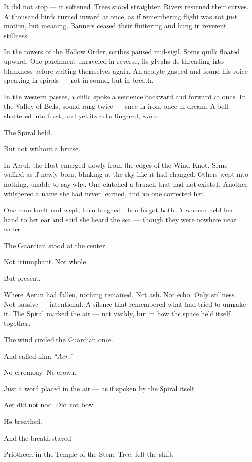 \documentclass[12pt]{article}
\begin{document}
It did not stop — it softened. Trees stood straighter. Rivers resumed their curves. A thousand birds turned inward at once, as if remembering flight was not just motion, but meaning. Banners ceased their fluttering and hung in reverent stillness.

In the towers of the Hollow Order, scribes paused mid-sigil. Some quills floated upward. One parchment unraveled in reverse, its glyphs de-threading into blankness before writing themselves again. An acolyte gasped and found his voice speaking in spirals — not in sound, but in breath.

In the western passes, a child spoke a sentence backward and forward at once. In the Valley of Bells, sound rang twice — once in iron, once in dream. A bell shattered into frost, and yet its echo lingered, warm.

The Spiral held.

But not without a bruise.

In Aerul, the Host emerged slowly from the edges of the Wind-Knot. Some walked as if newly born, blinking at the sky like it had changed. Others wept into nothing, unable to say why. One clutched a branch that had not existed. Another whispered a name she had never learned, and no one corrected her.

One man knelt and wept, then laughed, then forgot both. A woman held her hand to her ear and said she heard the sea — though they were nowhere near water.

The Guardian stood at the center.

Not triumphant. Not whole.

But present.

Where Aerun had fallen, nothing remained. Not ash. Not echo. Only stillness. Not passive — intentional. A silence that remembered what had tried to unmake it. The Spiral marked the air — not visibly, but in how the space held itself together.

The wind circled the Guardian once.

And called him: \textit{``Aer.''}

No ceremony. No crown.

Just a word placed in the air — as if spoken by the Spiral itself.

Aer did not nod. Did not bow.

He breathed.

And the breath stayed.

Priotheer, in the Temple of the Stone Tree, felt the shift.
\end{document}
